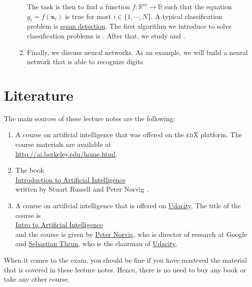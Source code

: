 \begin{enumerate}
\begin{enumerate}
            The task is then to find a function $f:\mathbb{R}^m \rightarrow \mathbb{B}$
            such that the equation $y_i = f(\mathbf{x}_i)$ is true for most $i\in\{1,\cdots,N\}$.  A typical
            classification problem is \href{https://en.wikipedia.org/wiki/Email_spam}{spam detection}.  The
            first algorithm we introduce to solve classification problems is .
            After that, we study  and .
      \item Finally, we discuss neural networks.  As an example, we will build a neural network that is able to
            recognize digits. 
      \end{enumerate}
\end{enumerate}
\pagebreak

\section{Literature}
The main sources of these lecture notes are the following:
\begin{enumerate}
\item A course on artificial intelligence that was offered on the \textsc{edX} platform.  The course
      materials are available at  
      \\[0.2cm]
      \hspace*{1.3cm}
      \href{http://ai.berkeley.edu/home.html}{http://ai.berkeley.edu/home.html}.
\item The book
      \\[0.2cm]
      \hspace*{1.3cm}
      \href{http://www.google.com/search?q=introduction+to+Artificial+Intelligence+RusseLl+Norvig+pdf}{Introduction to Artificial Intelligence}
      \\[0.2cm]
      written by Stuart Russell and Peter Norvig \cite{russell:2009}.
\item A course on artificial intelligence that is offered on \href{https://www.udacity.com}{Udacity}.  The title of the
      course is
      \\[0.2cm]
      \hspace*{1.3cm}
      \href{https://www.udacity.com/course/intro-to-artificial-intelligence--cs271}{Intro to Artificial Intelligence}
      \\[0.2cm]
      and the course is given by \href{https://en.wikipedia.org/wiki/Peter_Norvig}{Peter Norvig}, who is
      director of research at Google and \href{https://en.wikipedia.org/wiki/Sebastian_Thrun}{Sebastian Thrun},
      who is the chairman of \href{https://www.udacity.com}{Udacity}.
\end{enumerate}
When it comes to the exam, you should be fine if you have mastered the material that is covered in these
lecture notes.  Hence, there is no need to buy any book or take any other course.

